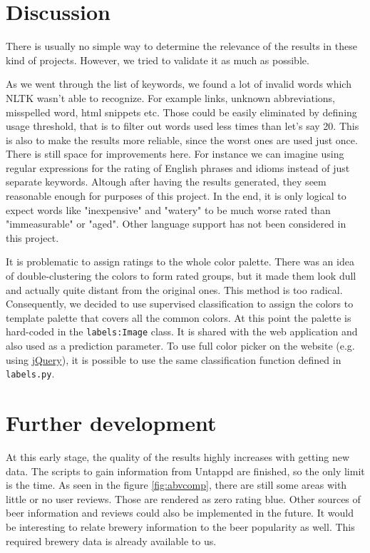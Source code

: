 \documentclass[10pt]{IEEEtran}
\begin{document}
\section{Discussion}
There is usually no simple way to determine the relevance of the results in these kind of projects. However, we tried to validate it as much as possible. 

As we went through the list of keywords, we found a lot of invalid words which NLTK wasn't able to recognize. For example links, unknown abbreviations, misspelled word, html snippets etc. Those could be easily eliminated by defining usage threshold, that is to filter out words used less times than let's say 20. This is also to make the results more reliable, since the worst ones are used just once. There is still space for improvements here. For instance we can imagine using regular expressions for the rating of English phrases and idioms instead of just separate keywords. Altough after having the results generated, they seem reasonable enough for purposes of this project. In the end, it is only logical to expect words like "inexpensive" and "watery" to be much worse rated than "immeasurable" or "aged". Other language support has not been considered in this project.

It is problematic to assign ratings to the whole color palette. There was an idea of double-clustering the colors to form rated groups, but it made them look dull and actually quite distant from the original ones. This method is too radical. Consequently, we decided to use supervised classification to assign the colors to template palette that covers all the common colors. At this point the palette is hard-coded in the \texttt{labels:Image} class. It is shared with the web application and also used as a prediction parameter. To use full color picker on the website (e.g. using  \href{http://jquery.com/}{jQuery}), it is possible to use the same classification function defined in \texttt{labels.py}.

\section{Further development}
At this early stage, the quality of the results highly increases with getting new data. The scripts to gain information from Untappd are finished, so the only limit is the time. As seen in the figure \ref{fig:abvcomp}, there are still some areas with little or no user reviews. Those are rendered as zero rating blue. Other sources of beer information and reviews could also be implemented in the future. 
It would be interesting to relate brewery information to the beer popularity as well. This required brewery data is already available to us.
\end{document}
